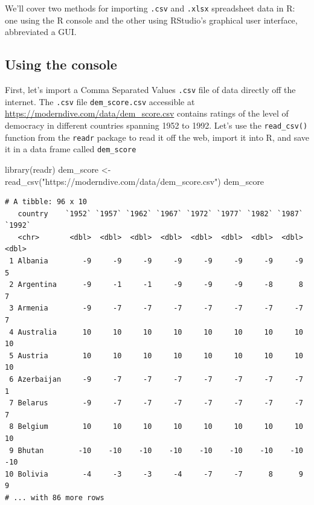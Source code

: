 \documentclass[
  letterpaper,
  DIV=11,
  numbers=noendperiod]{scrreprt}
\newenvironment{Shaded}{\begin{snugshade}}{\end{snugshade}}
\newcommand{\FunctionTok}[1]{\textcolor[rgb]{0.28,0.35,0.67}{#1}}
\newcommand{\NormalTok}[1]{\textcolor[rgb]{0.00,0.23,0.31}{#1}}
\newcommand{\OtherTok}[1]{\textcolor[rgb]{0.00,0.23,0.31}{#1}}
\newcommand{\StringTok}[1]{\textcolor[rgb]{0.13,0.47,0.30}{#1}}
\theoremstyle{definition}
\theoremstyle{remark}
\begin{document}
We'll cover two methods for importing \texttt{.csv} and \texttt{.xlsx}
spreadsheet data in R: one using the R console and the other using
RStudio's graphical user interface, abbreviated a GUI.

\hypertarget{using-the-console}{%
\subsection{Using the console}\label{using-the-console}}

First, let's import a Comma Separated Values \texttt{.csv} file of data
directly off the internet. The \texttt{.csv} file
\texttt{dem\_score.csv} accessible at
\url{https://moderndive.com/data/dem_score.csv} contains ratings of the
level of democracy in different countries spanning 1952 to 1992. Let's
use the \texttt{read\_csv()} function from the \texttt{readr} package to
read it off the web, import it into R, and save it in a data frame
called \texttt{dem\_score}

\begin{Shaded}
\begin{Highlighting}[]
\FunctionTok{library}\NormalTok{(readr)}
\NormalTok{dem\_score }\OtherTok{\textless{}{-}} \FunctionTok{read\_csv}\NormalTok{(}\StringTok{"https://moderndive.com/data/dem\_score.csv"}\NormalTok{)}
\NormalTok{dem\_score}
\end{Highlighting}
\end{Shaded}

\begin{verbatim}
# A tibble: 96 x 10
   country    `1952` `1957` `1962` `1967` `1972` `1977` `1982` `1987` `1992`
   <chr>       <dbl>  <dbl>  <dbl>  <dbl>  <dbl>  <dbl>  <dbl>  <dbl>  <dbl>
 1 Albania        -9     -9     -9     -9     -9     -9     -9     -9      5
 2 Argentina      -9     -1     -1     -9     -9     -9     -8      8      7
 3 Armenia        -9     -7     -7     -7     -7     -7     -7     -7      7
 4 Australia      10     10     10     10     10     10     10     10     10
 5 Austria        10     10     10     10     10     10     10     10     10
 6 Azerbaijan     -9     -7     -7     -7     -7     -7     -7     -7      1
 7 Belarus        -9     -7     -7     -7     -7     -7     -7     -7      7
 8 Belgium        10     10     10     10     10     10     10     10     10
 9 Bhutan        -10    -10    -10    -10    -10    -10    -10    -10    -10
10 Bolivia        -4     -3     -3     -4     -7     -7      8      9      9
# ... with 86 more rows
\end{verbatim}
\end{document}
